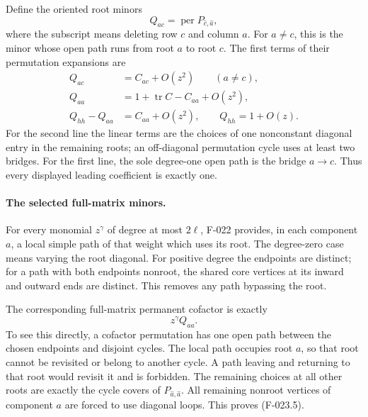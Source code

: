 Define the oriented root minors
\[
 Q_{ac}=\operatorname{per}P_{\widehat c,\widehat a},
                                                               \tag{F-023.3}
\]
where the subscript means deleting row \(c\) and column
\(a\). For \(a\ne c\), this is the minor whose open
path runs from root \(a\) to root \(c\). The first terms
of their permutation expansions are
\[
 \begin{split}
 Q_{ac}&=C_{ac}+O(z^2)\qquad(a\ne c),\\
 Q_{aa}&=1+\operatorname{tr}C-C_{aa}+O(z^2),\\
 Q_{hh}-Q_{aa}&=C_{aa}+O(z^2),\qquad
 Q_{hh}=1+O(z).
 \end{split}                                             \tag{F-023.4}
\]
For the second line the linear terms are the choices of one
nonconstant diagonal entry in the remaining roots; an off-diagonal
permutation cycle uses at least two bridges. For the first line,
the sole degree-one open path is the bridge \(a\to c\).
Thus every displayed leading coefficient is exactly one.

\paragraph{The selected full-matrix minors.}
For every monomial \(z^\gamma\) of degree at most
\(2\ell\), F-022 provides, in each component \(a\),
a local simple path of that weight which uses its root.
The degree-zero case means varying the root diagonal.
For positive degree the endpoints are distinct; for a path
with both endpoints nonroot, the shared core vertices at
its inward and outward ends are distinct. This removes
any path bypassing the root.

The corresponding full-matrix permanent cofactor is exactly
\[
                                  z^\gamma Q_{aa}.
                                                               \tag{F-023.5}
\]
To see this directly, a cofactor permutation has one open
path between the chosen endpoints and disjoint cycles.
The local path occupies root \(a\), so that root cannot
be revisited or belong to another cycle. A path leaving and
returning to that root would revisit it and is forbidden.
The remaining choices at all other roots are exactly the
cycle covers of \(P_{\widehat a,\widehat a}\).
All remaining nonroot vertices of component \(a\) are
forced to use diagonal loops. This proves (F-023.5).


